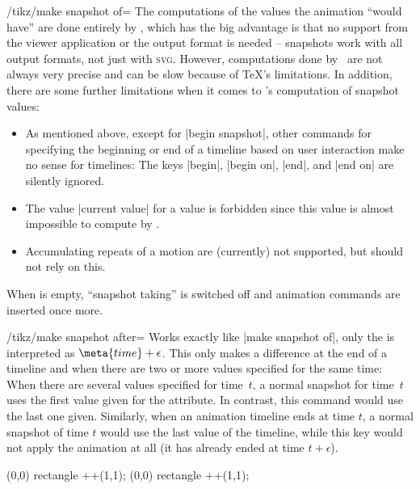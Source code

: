 \begin{key}{/tikz/make snapshot of=}
  The computations of the values the animation ``would have'' are done
  entirely by \tikzname, which has the big advantage is that no
  support from the viewer application or the output format is needed
  -- snapshots work with all output formats, not just with
  \textsc{svg}. However, computations done by \tikzname\ are not
  always very precise and can be slow because of \TeX's
  limitations. In addition, there are some further limitations when it
  comes to \tikzname's computation of snapshot values:

  \begin{itemize}
  \item As mentioned above, except for |begin snapshot|, other
    commands for specifying the beginning or end of a timeline based
    on user interaction make no sense for timelines: The keys |begin|,
    |begin on|, |end|, and |end on| are silently ignored.
  \item The value |current value| for a value is forbidden since this
    value is almost impossible to compute by \tikzname.
  \item Accumulating repeats of a motion are (currently) not
    supported, but should not rely on this.
  \end{itemize}
  
  When  is empty, ``snapshot taking'' is switched off and
  animation commands are inserted once more.
\end{key}


\begin{key}{/tikz/make snapshot after=}
  Works exactly like |make snapshot of|, only the  is
  interpreted as $\meta{time} + \epsilon$. This only makes a
  difference at the end of a timeline and when there are two or more
  values specified for the same time: When there are several values
  specified for time~$t$, a normal snapshot for time~$t$ uses the
  first value given for the attribute. In contrast, this command would
  use the last one given. Similarly, when an animation timeline ends
  at time $t$, a normal snapshot of time $t$ would use the last
  value of the timeline, while this key would not apply the animation
  at all (it has already ended at time $t + \epsilon$).
  
\begin{codeexample}[]
\tikz [make snapshot of = 2s] 
  \fill [animate me = { :fill = { 0s = "green", 2s = "red" } }]
    (0,0) rectangle ++(1,1);
\tikz [make snapshot after = 2s] 
  \fill [animate me = { :fill = { 0s = "green", 2s = "red" } }]
    (0,0) rectangle ++(1,1);
\end{codeexample}
\end{key}



